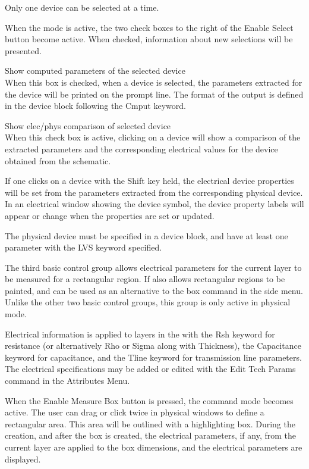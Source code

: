 Only one device can be selected at a time.

When the mode is active, the two check boxes to the right of the {\cb
Enable Select} button become active.  When checked, information about
new selections will be presented.

\begin{description}
\item{\cb Show computed parameters of the selected device}\\
When this box is checked, when a device is selected, the parameters
extracted for the device will be printed on the prompt line.  The
format of the output is defined in the device block following the {\et
Cmput} keyword.

\item{\cb Show elec/phys comparison of selected device}\\
When this check box is active, clicking on a device will show a
comparison of the extracted parameters and the corresponding
electrical values for the device obtained from the schematic.

If one clicks on a device with the {\kb Shift} key held, the
electrical device properties will be set from the parameters extracted
from the corresponding physical device.  In an electrical window
showing the device symbol, the device property labels will appear or
change when the properties are set or updated.

The physical device must be specified in a device block, and have at
least one parameter with the {\et LVS} keyword specified.
\end{description}

The third basic control group allows electrical parameters for the
current layer to be measured for a rectangular region.  If also allows
rectangular regions to be painted, and can be used as an alternative
to the {\cb box} command in the side menu.  Unlike the other two basic
control groups, this group is only active in physical mode.

Electrical information is applied to layers in the with the {\et Rsh}
keyword for resistance (or alternatively {\et Rho} or {\et Sigma}
along with {\et Thickness}), the {\et Capacitance} keyword for
capacitance, and the {\et Tline} keyword for transmission line
parameters.  The electrical specifications may be added or edited with
the {\cb Edit Tech Params} command in the {\cb Attributes Menu}.

When the {\cb Enable Measure Box} button is pressed, the command mode
becomes active.  The user can drag or click twice in physical windows
to define a rectangular area.  This area will be outlined with a
highlighting box.  During the creation, and after the box is created,
the electrical parameters, if any, from the current layer are applied
to the box dimensions, and the electrical parameters are displayed.

